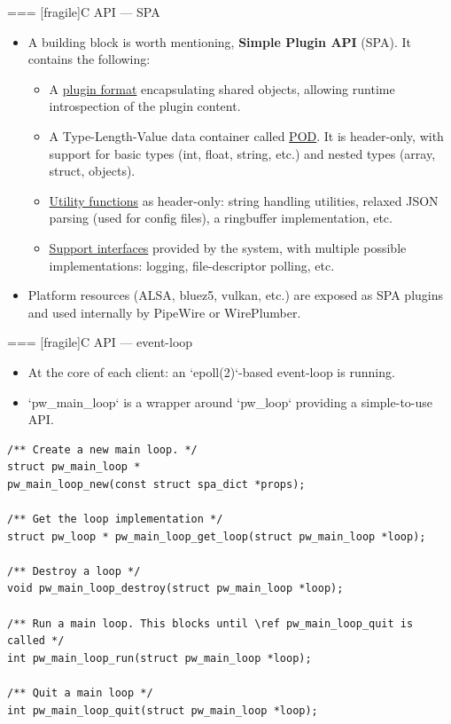 === [fragile]{C API — SPA}
  \begin{itemize}

  \item A building block is worth mentioning, \textbf{Simple Plugin
    API} (SPA). It contains the following:

    \begin{itemize}
    \item A \href{https://docs.pipewire.org/page_spa.html#autotoc_md225}{plugin format}
      encapsulating shared objects, allowing
      runtime introspection of the plugin content.
    \item A Type-Length-Value data container called
      \href{https://docs.pipewire.org/page_spa_pod.html}{POD}. It is
      header-only, with support for basic types (int, float,
      string, etc.) and nested types (array, struct, objects).
    \item \href{https://docs.pipewire.org/group__spa__utils.html}{Utility functions}
      as header-only: string handling utilities,
      relaxed JSON parsing (used for config files), a ringbuffer
      implementation, etc.
    \item \href{https://docs.pipewire.org/group__spa__support.html}{Support interfaces}
      provided by the system, with multiple
      possible implementations: logging, file-descriptor polling, etc.
    \end{itemize}

  \item Platform resources (ALSA, bluez5, vulkan, etc.) are exposed
    as SPA plugins and used internally by PipeWire or WirePlumber.

  \end{itemize}




=== [fragile]{C API — event-loop}
  \begin{itemize}
  \item At the core of each client: an `epoll(2)`-based event-loop
    is running.
  \item `pw_main_loop` is a wrapper around `pw_loop`
    providing a simple-to-use API.
  \end{itemize}

      \begin{block}{}
        \fontsize{9}{9}\selectfont
          \begin{verbatim}
/** Create a new main loop. */
struct pw_main_loop *
pw_main_loop_new(const struct spa_dict *props);

/** Get the loop implementation */
struct pw_loop * pw_main_loop_get_loop(struct pw_main_loop *loop);

/** Destroy a loop */
void pw_main_loop_destroy(struct pw_main_loop *loop);

/** Run a main loop. This blocks until \ref pw_main_loop_quit is called */
int pw_main_loop_run(struct pw_main_loop *loop);

/** Quit a main loop */
int pw_main_loop_quit(struct pw_main_loop *loop);
          \end{verbatim}
      \end{block}




